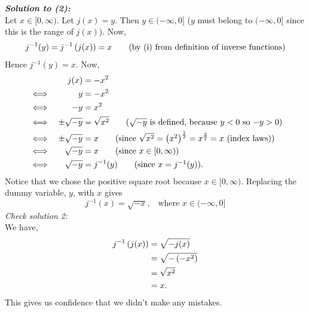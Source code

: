 \bigskip
\noindent \textbf{\textit{Solution to (2):}} \\
Let $x \in [0,\infty)$. Let $j(x) = y$. Then $y \in (-\infty,0]$ ($y$ must belong to $(-\infty,0]$ since this is the range of $j(x)$). Now,
\[
j^{-1}(y) = j^{-1}\left(j(x)\right) = x \tag{by (i) from definition of inverse functions}
\]
Hence $j^{-1}(y) = x$. Now,
\begin{alignat*}{2}
&& j(x) 
& = -x^2 \\
& \iff 
& y 
& = -x^2 \\
& \iff
& -y 
& = x^2 \\
& \iff
& \pm\sqrt{-y}
& = \sqrt{x^2} \tag{$\sqrt{-y}$ is defined, because $y < 0$ so $-y > 0$} \\
& \iff
& \pm\sqrt{-y}
& = x \tag{since $\sqrt{x^2} = \brac{x^2}^\frac{1}{2} = x^\frac{2}{2} = x$ (index laws)} \\
& \iff
& \sqrt{-y}
& = x \tag{since $x \in [0,\infty)$} \\
& \iff 
& \sqrt{-y}
& = j^{-1}(y) \tag{since $x = j^{-1}(y)$}.
\end{alignat*}
Notice that we chose the positive square root because $x \in [0,\infty)$. Replacing the dummy variable, $y$, with $x$ gives
\[
j^{-1}(x) = \sqrt{-x}, \;\;\; \text{where $x \in (-\infty,0]$}
\]
\noindent\textit{Check solution 2:} \\
We have,
\begin{align*}
j^{-1}\left(j(x)\right) & = \sqrt{-j(x)} \\
			    & = \sqrt{-\left(-x^2\right)} \\
			    & = \sqrt{x^2} \\
			    & = x.
\end{align*}
This gives us confidence that we didn't make any mistakes. \\

